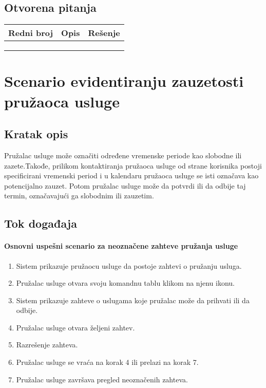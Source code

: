 \documentclass[a4paper,12pt]{report}
\newcommand{\dativfunkcionalnosti}{evidentiranju zauzetosti pružaoca usluge}
\begin{document}
\subsection{Otvorena pitanja}
    \begin{center}
    \begin{tabular}{ |c|p{10cm}|l| }
    \hline
    \textbf{Redni broj} & \hspace{4cm} \textbf{Opis} & \textbf{Rešenje} \\ 
    \hline
     & & \\
     \hline
      & &   \\
     \hline
     & &   \\
     \hline
    \end{tabular}
    \end{center}
\section{Scenario \dativfunkcionalnosti}
\subsection{Kratak opis}
    Pružalac usluge može označiti određene vremenske periode kao slobodne ili zazete.Takođe, prilikom kontaktiranja pružaoca usluge od strane korisnika postoji specificirani vremenski period i u kalendaru pružaoca usluge se isti označava kao potencijalno zauzet. Potom pružalac usluge može da potvrdi ili da odbije taj termin, označavajući ga slobodnim ili zauzetim.

\subsection{Tok događaja}
    \paragraph*{Osnovni uspešni scenario za neoznačene zahteve pružanja usluge}
    \begin{enumerate}
        \item Sistem prikazuje pružaocu usluge da postoje zahtevi o pružanju usluga.
        \item Pružalac usluge otvara svoju komandnu tablu klikom na njenu ikonu.
        \item Sistem prikazuje zahteve o uslugama koje pružalac može da prihvati ili da odbije.
        \item Pružalac usluge otvara željeni zahtev.
        \item Razrešenje zahteva.
        \item Pružalac usluge se vraća na korak 4 ili prelazi na korak 7.
        \item Pružalac usluge završava pregled neoznačenih zahteva.
    \end{enumerate}
    
\end{document}
